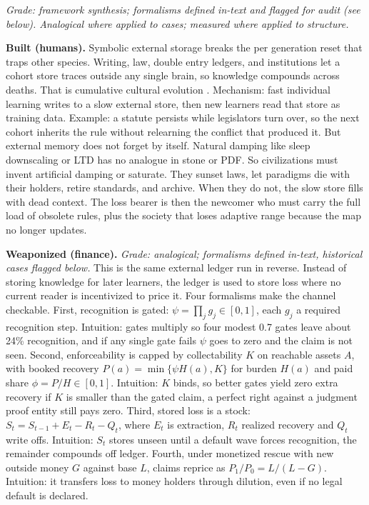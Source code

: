 \documentclass[11pt]{article}
\begin{document}
\textit{Grade: framework synthesis; formalisms defined in-text and flagged for audit (see below). Analogical where applied to cases; measured where applied to structure.}

\textbf{Built (humans).} Symbolic external storage breaks the per generation reset that traps other species. Writing, law, double entry ledgers, and institutions let a cohort store traces outside any single brain, so knowledge compounds across deaths. That is cumulative cultural evolution \citep{tomasello,henrich}. Mechanism: fast individual learning writes to a slow external store, then new learners read that store as training data. Example: a statute persists while legislators turn over, so the next cohort inherits the rule without relearning the conflict that produced it. But external memory does not forget by itself. Natural damping like sleep downscaling or LTD has no analogue in stone or PDF. So civilizations must invent artificial damping or saturate. They sunset laws, let paradigms die with their holders, retire standards, and archive. When they do not, the slow store fills with dead context. The loss bearer is then the newcomer who must carry the full load of obsolete rules, plus the society that loses adaptive range because the map no longer updates.

\textbf{Weaponized (finance).} \textit{Grade: analogical; formalisms defined in-text, historical cases flagged below.} This is the same external ledger run in reverse. Instead of storing knowledge for later learners, the ledger is used to store loss where no current reader is incentivized to price it. Four formalisms make the channel checkable. First, recognition is gated: $\psi=\prod_j g_j\in[0,1]$, each $g_j$ a required recognition step. Intuition: gates multiply so four modest 0.7 gates leave about 24\% recognition, and if any single gate fails $\psi$ goes to zero and the claim is not seen. Second, enforceability is capped by collectability $K$ on reachable assets $A$, with booked recovery $P(a)=\min\{\psi H(a),K\}$ for burden $H(a)$ and paid share $\phi=P/H\in[0,1]$. Intuition: $K$ binds, so better gates yield zero extra recovery if $K$ is smaller than the gated claim, a perfect right against a judgment proof entity still pays zero. Third, stored loss is a stock: $S_t=S_{t-1}+E_t-R_t-Q_t$, where $E_t$ is extraction, $R_t$ realized recovery and $Q_t$ write offs. Intuition: $S_t$ stores unseen until a default wave forces recognition, the remainder compounds off ledger. Fourth, under monetized rescue with new outside money $G$ against base $L$, claims reprice as $P_1/P_0=L/(L-G)$. Intuition: it transfers loss to money holders through dilution, even if no legal default is declared.
\end{document}

